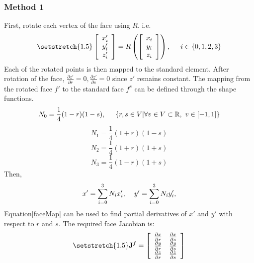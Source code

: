  \subsubsection{Method 1}
 First, rotate each vertex of the face using $R$. 
 i.e.
 \begin{equation}
	 {\setstretch{1.5}
	 \left[\begin{array}{c}
			  x'_i  \\
			  y'_i  \\
			  z'_i \\
	  \end{array} \right] 
	  = 
	  R\left(
	 \left[\begin{array}{c}
			  x_i  \\
			  y_i  \\
			  z_i \\
	  \end{array} \right]
	  \right), \hspace{5mm} i \in \{0,1,2,3\}
  }
 \end{equation}
 Each of the rotated points is then mapped to the standard element.
 After rotation of the face, $\frac{\partial z'}{\partial r} = 0, \frac{\partial z'}{\partial s}=0$ since 
 $z'$ remains constant. 
The mapping from the rotated face $f'$ to the standard face $f^s$ can be defined through the shape functions. 
\begin{equation}\label{shape0f}
	N_0 = \frac{1}{4} (1-r) (1-s) , \hspace{5mm} \{r,s \in V | \forall v \in V \subset {\mathbb{R}}  , ~ v \in [-1,1]\}
\end{equation}
\begin{equation}\label{shape1f}
	N_1 = \frac{1}{4} (1+r) (1-s) 
\end{equation}
\begin{equation}\label{shape2f}
	N_2 = \frac{1}{4} (1+r) (1+s)
\end{equation}
\begin{equation}\label{shape3f}
	N_3 = \frac{1}{4} (1-r) (1+s)
\end{equation}
Then,
\begin{equation}\label{faceMap}
	x' = \sum_{i=0}^3 N_i x'_i, \hspace{4mm}y' = \sum_{i=0}^3 N_i y'_i,
\end{equation}
Equation\ref{faceMap} can be used to find partial derivatives of $x'$ and $y'$ with respect to $r$ and $s$.
The required face Jacobian is:
 \begin{equation}\label{method1J}
	 {\setstretch{1.5}
	 \mathbf{J}^f = 
	 \left[\begin{array}{c c}
			 \frac{\partial x}{\partial r}  & \frac{\partial x}{\partial s}  \\
			 \frac{\partial y}{\partial r}  & \frac{\partial y}{\partial s}  \\
			 \frac{\partial z}{\partial r}  & \frac{\partial z}{\partial s}  \\
         \end{array} \right]
 }
 \end{equation}
